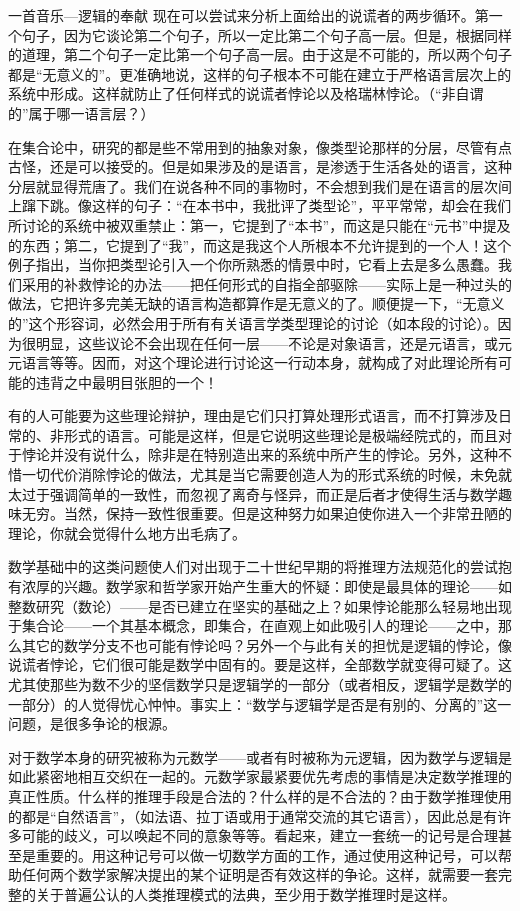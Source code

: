 \begin{intro}{一首音乐—逻辑的奉献}
现在可以尝试来分析上面给出的说谎者的两步循环。第一个句子，因为它谈论第二个句子，所以一定比第二个句子高一层。但是，根据同样的道理，第二个句子一定比第一个句子高一层。由于这是不可能的，所以两个句子都是“无意义的”。更准确地说，这样的句子根本不可能在建立于严格语言层次上的系统中形成。这样就防止了任何样式的说谎者悖论以及格瑞林悖论。（“非自谓的”属于哪一语言层？）

在集合论中，研究的都是些不常用到的抽象对象，像类型论那样的分层，尽管有点古怪，还是可以接受的。但是如果涉及的是语言，是渗透于生活各处的语言，这种分层就显得荒唐了。我们在说各种不同的事物时，不会想到我们是在语言的层次间上蹿下跳。像这样的句子：“在本书中，我批评了类型论”，平平常常，却会在我们所讨论的系统中被双重禁止：第一，它提到了“本书”，而这是只能在“元书”中提及的东西；第二，它提到了“我”，而这是我这个人所根本不允许提到的一个人！这个例子指出，当你把类型论引入一个你所熟悉的情景中时，它看上去是多么愚蠢。我们采用的补救悖论的办法——把任何形式的自指全部驱除——实际上是一种过头的做法，它把许多完美无缺的语言构造都算作是无意义的了。顺便提一下，“无意义的”这个形容词，必然会用于所有有关语言学类型理论的讨论（如本段的讨论）。因为很明显，这些议论不会出现在任何一层——不论是对象语言，还是元语言，或元元语言等等。因而，对这个理论进行讨论这一行动本身，就构成了对此理论所有可能的违背之中最明目张胆的一个！

有的人可能要为这些理论辩护，理由是它们只打算处理形式语言，而不打算涉及日常的、非形式的语言。可能是这样，但是它说明这些理论是极端经院式的，而且对于悖论并没有说什么，除非是在特别造出来的系统中所产生的悖论。另外，这种不惜一切代价消除悖论的做法，尤其是当它需要创造人为的形式系统的时候，未免就太过于强调简单的一致性，而忽视了离奇与怪异，而正是后者才使得生活与数学趣味无穷。当然，保持一致性很重要。但是这种努力如果迫使你进入一个非常丑陋的理论，你就会觉得什么地方出毛病了。

数学基础中的这类问题使人们对出现于二十世纪早期的将推理方法规范化的尝试抱有浓厚的兴趣。数学家和哲学家开始产生重大的怀疑：即使是最具体的理论——如整数研究（数论）——是否已建立在坚实的基础之上？如果悖论能那么轻易地出现于集合论——一个其基本概念，即集合，在直观上如此吸引人的理论——之中，那么其它的数学分支不也可能有悖论吗？另外一个与此有关的担忧是逻辑的悖论，像说谎者悖论，它们很可能是数学中固有的。要是这样，全部数学就变得可疑了。这尤其使那些为数不少的坚信数学只是逻辑学的一部分（或者相反，逻辑学是数学的一部分）的人觉得忧心忡忡。事实上：“数学与逻辑学是否是有别的、分离的”这一问题，是很多争论的根源。

对于数学本身的研究被称为元数学——或者有时被称为元逻辑，因为数学与逻辑是如此紧密地相互交织在一起的。元数学家最紧要优先考虑的事情是决定数学推理的真正性质。什么样的推理手段是合法的？什么样的是不合法的？由于数学推理使用的都是“自然语言”，（如法语、拉丁语或用于通常交流的其它语言），因此总是有许多可能的歧义，可以唤起不同的意象等等。看起来，建立一套统一的记号是合理甚至是重要的。用这种记号可以做一切数学方面的工作，通过使用这种记号，可以帮助任何两个数学家解决提出的某个证明是否有效这样的争论。这样，就需要一套完整的关于普遍公认的人类推理模式的法典，至少用于数学推理时是这样。


\end{intro}
